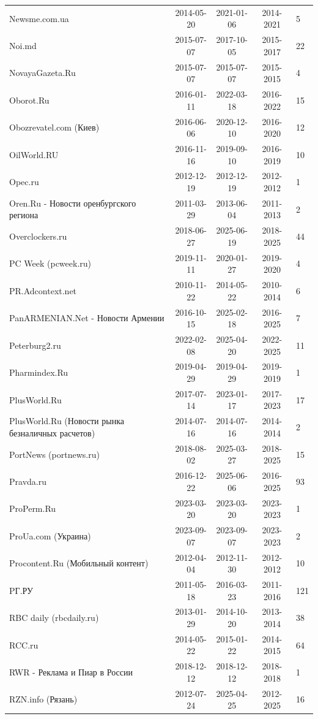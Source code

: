 \begin{longtable}{p{6cm}cccp{2cm}}
Newsme.com.ua & 2014-05-20 & 2021-01-06 & 2014-2021 & 5\\
Noi.md & 2015-07-07 & 2017-10-05 & 2015-2017 & 22\\
NovayaGazeta.Ru & 2015-07-07 & 2015-07-07 & 2015-2015 & 4\\
Oborot.Ru & 2016-01-11 & 2022-03-18 & 2016-2022 & 15\\
Obozrevatel.com (Киев) & 2016-06-06 & 2020-12-10 & 2016-2020 & 12\\
OilWorld.RU & 2016-11-16 & 2019-09-10 & 2016-2019 & 10\\
Opec.ru & 2012-12-19 & 2012-12-19 & 2012-2012 & 1\\
Oren.Ru - Новости оренбургского региона & 2011-03-29 & 2013-06-04 & 2011-2013 & 2\\
Overclockers.ru & 2018-06-27 & 2025-06-19 & 2018-2025 & 44\\
PC Week (pcweek.ru) & 2019-11-11 & 2020-01-27 & 2019-2020 & 4\\
PR.Adcontext.net & 2010-11-22 & 2014-05-22 & 2010-2014 & 6\\
PanARMENIAN.Net - Новости Армении & 2016-10-15 & 2025-02-18 & 2016-2025 & 7\\
Peterburg2.ru & 2022-02-08 & 2025-04-20 & 2022-2025 & 11\\
Pharmindex.Ru & 2019-04-29 & 2019-04-29 & 2019-2019 & 1\\
PlusWorld.Ru & 2017-07-14 & 2023-01-17 & 2017-2023 & 17\\
PlusWorld.Ru (Новости рынка безналичных расчетов) & 2014-07-16 & 2014-07-16 & 2014-2014 & 2\\
PortNews (portnews.ru) & 2018-08-02 & 2025-03-27 & 2018-2025 & 15\\
Pravda.ru & 2016-12-22 & 2025-06-06 & 2016-2025 & 93\\
ProPerm.Ru & 2023-03-20 & 2023-03-20 & 2023-2023 & 1\\
ProUa.com (Украина) & 2023-09-07 & 2023-09-07 & 2023-2023 & 2\\
Procontent.Ru (Мобильный контент) & 2012-04-04 & 2012-11-30 & 2012-2012 & 10\\
PГ.РУ & 2011-05-18 & 2016-03-23 & 2011-2016 & 121\\
RBC daily (rbcdaily.ru) & 2013-01-29 & 2014-10-20 & 2013-2014 & 38\\
RCC.ru & 2014-05-22 & 2015-01-22 & 2014-2015 & 64\\
RWR - Реклама и Пиар в России & 2018-12-12 & 2018-12-12 & 2018-2018 & 1\\
RZN.info (Рязань) & 2012-07-24 & 2025-04-25 & 2012-2025 & 16\\

\end{longtable}
